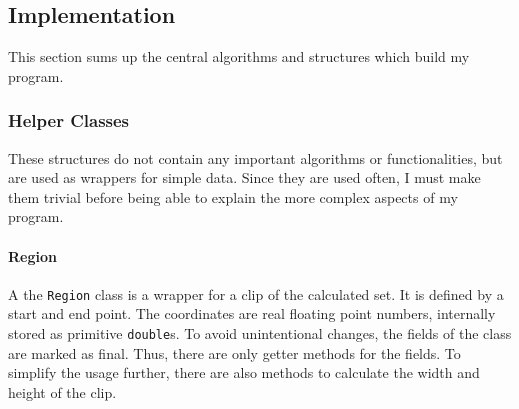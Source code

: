 \documentclass[10pt,a4paper,titlepage]{article}
\begin{document}
	\subsection{Implementation}
	This section sums up the central algorithms and structures which build my program.
	\subsubsection{Helper Classes}
	These structures do not contain any important algorithms or functionalities, but are used as wrappers for simple data. Since they are used often, I must make them trivial before being able to explain the more complex aspects of my program.
	\paragraph{Region}
	A the \verb|Region| class is a wrapper for a clip of the calculated set. It is defined by a start and end point. The coordinates are real floating point numbers, internally stored as primitive \verb|double|s. To avoid unintentional changes, the fields of the class are marked as final. Thus, there are only getter methods for the fields. To simplify the usage further, there are also methods to calculate the width and height of the clip.
\end{document}
